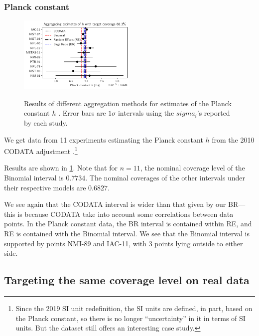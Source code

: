 \documentclass[letterpaper,12pt]{article}
\begin{document}
\subsubsection{Planck constant}\label{planck-constant}

\begin{figure}[htpb]
\centering
\includegraphics[width=0.5\textwidth]{figs/h0.pdf}
\label{fig:h}
\caption{Results of different aggregation methods for estimates of the Planck constant $h$ \cite[Table 26]{mohr2012codata}. Error bars are $1\sigma$ intervals using the $sigma_i$'s reported by each study.}
\end{figure}

We get data from 11 experiments estimating the Planck constant $h$ from the 2010 CODATA adjustment \cite[Table 26]{mohr2012codata}.\footnote{Since the 2019 SI unit redefinition, the SI units are defined, in part, based on the Planck constant, so there is no longer ``uncertainty'' in it in terms of SI units. But the dataset still offers an interesting case study.}

Results are shown in \ref{fig:h}. Note that for $n=11$, the nominal coverage level of the Binomial interval is $0.7734$. The nominal coverages of the other intervals under their respective models are $0.6827$.

We see again that the CODATA interval is wider than that given by our BR---this is because CODATA take into account some correlations between data points. In the Planck constant data, the BR interval is contained within RE, and RE is contained with the Binomial interval. We see that the Binomial interval is supported by points NMI-89 and IAC-11, with 3 points lying outside to either side.

\subsection{Targeting the same coverage level on real data}\label{targeting-the-same-coverage-level-on-real-data}
\end{document}
